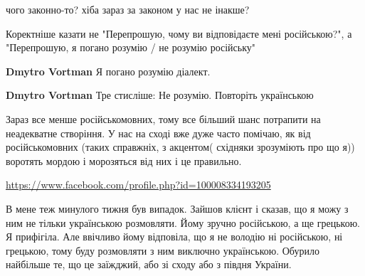 \begin{itemize}
\begin{itemize}
чого законно-то? хіба зараз за законом у нас не інакше?
\end{itemize}

 

Коректніше казати не "Перепрошую, чому ви відповідаєте мені російською?", а
"Перепрошую, я погано розумію / не розумію російську"

\begin{itemize}
 
\textbf{Dmytro Vortman} Я погано розумію діалект.

 
\textbf{Dmytro Vortman} Тре стисліше: Не розумію. Повторіть українською
\end{itemize}

 

Зараз все менше російськомовних, тому все більший шанс потрапити на неадекватне
створіння. У нас на сході вже дуже часто помічаю, як від російськомовних (таких
справжніх, з акцентом( східняки зрозуміють про що я)) воротять мордою і
морозяться від них і це правильно.


\url{https://www.facebook.com/profile.php?id=100008334193205}\par
 

В мене теж минулого тижня був випадок. Зайшов клієнт і сказав, що я можу з ним
не тільки українською розмовляти. Йому зручно російською, а ще грецькою. Я
прифігіла. Але ввічливо йому відповіла, що я не володію ні російською, ні
грецькою, тому буду розмовляти з ним виключно українською. Обурило найбільше
те, що це заїжджий, або зі сходу або з півдня України.



\end{itemize}
